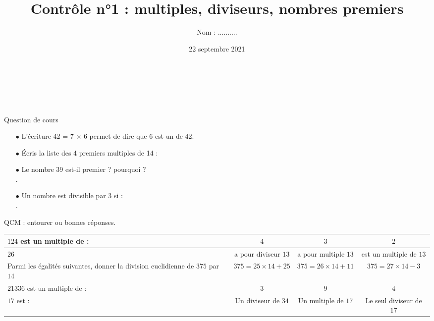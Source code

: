 \documentclass[a4paper]{article}
\title{Contrôle n°1 : multiples, diviseurs, nombres premiers}
\date{22 septembre 2021}
\author{Nom : ..........}
\makeatletter
\renewcommand{\maketitle}{%
    \topskip0pt
	\@author \hfill \@date \\

	\begin{center}
		\begin{huge}
			\@title \\[2em]
		\end{huge}
	\end{center}
}
\makeatother
\begin{document}
\maketitle

\begin{question}[(4 points)] Question de cours \\
	\begin{itemize}
		\setlength\itemsep{0.4em}
		\item[$\bullet$] L’écriture 42 = 7 × 6 permet de dire que 6 est un \dotfill de 42.
		\item[$\bullet$] Écris la liste des 4 premiers multiples de 14 : \dotfill
		\item[$\bullet$] Le nombre 39 est-il premier ? pourquoi ? \dotfill \\[0.5em] .\dotfill
		\item[$\bullet$] Un nombre est divisible par 3 si : \dotfill \\[0.5em] .\dotfill
	\end{itemize}
\end{question}

\begin{question}[(3,5 points)] QCM : entourer  ou  bonnes réponses.

	\renewcommand{\arraystretch}{1.8}
	\begin{tabular}[t]{|m{3.8cm}|c|c|c|}
		\firsthline
		$124$ est un multiple de :   & $4$                  & $3$                  & $2$                      \\ \hline
		$26$                         & a pour diviseur $13$ & a pour multiple $13$ & est un multiple de $13$  \\ \hline
		Parmi les égalités
		suivantes, donner la
		division euclidienne de
		$375$ par $14$               & $375=25×14 +25$      & $375=26×14+11$       & $375=27×14-3$            \\ \hline
		$21336$ est un multiple de : & $3$                  & $9$                  & $4$                      \\ \hline
		$17$ est :                   & Un diviseur de $34$  & Un multiple de $17$  & Le seul diviseur de $17$ \\ \hline
	\end{tabular}
	\renewcommand{\arraystretch}{1}
\end{question}
\end{document}

